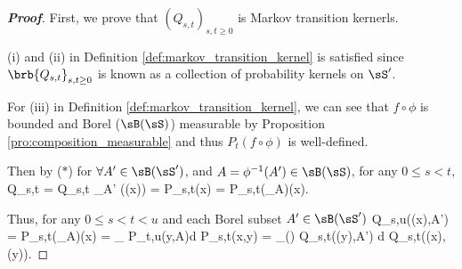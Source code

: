 \begin{proof}[\bf Proof]
First, we prove that $(Q_{s,t})_{s,t\geq 0}$ is Markov transition kernerls.

(i) and (ii) in Definition \ref{def:markov_transition_kernel} is satisfied since $\brb{Q_{s,t}}_{s,t\geq 0}$ is known as a collection of probability kernels on $\sS'$.


For (iii) in Definition \ref{def:markov_transition_kernel}, we can see that $f\circ \phi$ is bounded and Borel ($\sB(\sS)$) measurable by Proposition \ref{pro:composition_measurable} and thus $P_t(f\circ \phi)$ is well-defined.

Then by ($*$) for $\forall A'\in \sB(\sS')$, and $A = \phi^{-1}(A')\in \sB(\sS)$, for any $0\leq s< t$,
\be
Q_{s,t} = Q_{s,t} \ind_{A'} (\phi(x)) = P_{s,t}(x) = P_{s,t}(\ind_A)(x).
\ee





Thus, for any $0\leq s<t<u$  and each Borel subset $A'\in \sB(\sS')$
\be
Q_{s,u}(\phi(x),A') = P_{s,t}(\ind_A)(x) = \int_{\sS} P_{t,u}(y,A)d P_{s,t}(x,y) = \int_{\phi(\sS)} Q_{s,t}(\phi(y),A') d Q_{s,t}(\phi(x),\phi(y)).
\ee




\end{proof}
